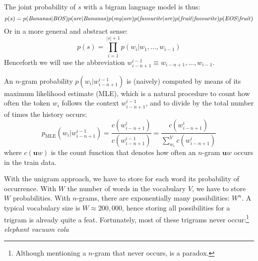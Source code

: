 The joint probability of $s$ with a bigram language model is thus:
\[ p(s) = p(\textnormal{\emph{Bananas}}|\textnormal{\emph{BOS}})p(\textnormal{\emph{are}}|\textnormal{\emph{Bananas}})p(\textnormal{\emph{my}}|\textnormal{\emph{are}})p(\textnormal{\emph{favourite}}|\textnormal{\emph{are}})p(\textnormal{\emph{fruit}}|\textnormal{\emph{favourite}})p(\textnormal{\emph{EOS}}|\textnormal{\emph{fruit}})\]
Or in a more general and abstract sense:
\[ p(s) = \prod_{i=1}^{|s|+1}p(w_i|w_1,\ldots,w_{i-1}) \]
Henceforth we will use the abbreviation $w_{i-n+1}^{i-1} \equiv w_{i-n+1},\ldots,w_{i-1}$.

An $n$-gram probability $p(w_i|w_{i-n+1}^{i-1})$ is (naively) computed by means of its maximum likelihood estimate (MLE), which is a natural procedure to count how often the token $w_i$ follows the context $w_{i-n+1}^{i-1}$, and to divide by the total number of times the history occurs:
\begin{equation} p_{\operatorname{MLE}}\left(w_i|w_{i-n+1}^{i-1}\right) = \frac{c\left(w_{i-n+1}^i\right)}{c\left(w_{i-n+1}^{i-1}\right)} = \frac{c\left(w_{i-n+1}^{i}\right)}{\sum_{w_i}^{V}c\left(w_{i-n+1}^{i}\right)}\label{eq:pmle}
\end{equation}
where $c(\mathbf{u}w)$ is the count function that denotes how often an $n$-gram $\mathbf{u}w$ occurs in the train data.

With the unigram approach, we have to store for each word its probability of occurrence. With $W$ the number of words in the vocabulary $V$, we have to store $W$ probabilities. With $n$-grams, there are exponentially many possibilities: $W^n$. A typical vocabulary size is $W\approx 200,000$, hence storing all possibilities for a trigram is already quite a feat. Fortunately, most of these trigrams never occur:\footnote{Although mentioning a $n$-gram that never occurs, is a paradox.} \emph{elephant vacuum cola}





